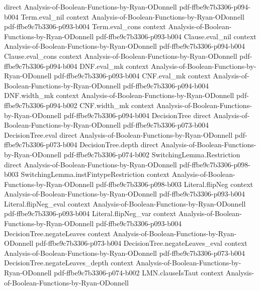 \begin{theorem}
  {direct}
  {Analysis-of-Boolean-Functions-by-Ryan-ODonnell}
  {pdf-ffbe9c7b3306-p094-b004}
\proofstep
  {Term.eval_nil}
  {context}
  {Analysis-of-Boolean-Functions-by-Ryan-ODonnell}
  {pdf-ffbe9c7b3306-p093-b004}
\proofstep
  {Term.eval_cons}
  {context}
  {Analysis-of-Boolean-Functions-by-Ryan-ODonnell}
  {pdf-ffbe9c7b3306-p093-b004}
\proofstep
  {Clause.eval_nil}
  {context}
  {Analysis-of-Boolean-Functions-by-Ryan-ODonnell}
  {pdf-ffbe9c7b3306-p094-b004}
\proofstep
  {Clause.eval_cons}
  {context}
  {Analysis-of-Boolean-Functions-by-Ryan-ODonnell}
  {pdf-ffbe9c7b3306-p094-b004}
\proofstep
  {DNF.eval_mk}
  {context}
  {Analysis-of-Boolean-Functions-by-Ryan-ODonnell}
  {pdf-ffbe9c7b3306-p093-b004}
\proofstep
  {CNF.eval_mk}
  {context}
  {Analysis-of-Boolean-Functions-by-Ryan-ODonnell}
  {pdf-ffbe9c7b3306-p094-b004}
\proofstep
  {DNF.width_mk}
  {context}
  {Analysis-of-Boolean-Functions-by-Ryan-ODonnell}
  {pdf-ffbe9c7b3306-p094-b002}
\proofstep
  {CNF.width_mk}
  {context}
  {Analysis-of-Boolean-Functions-by-Ryan-ODonnell}
  {pdf-ffbe9c7b3306-p094-b004}
\proofstep
  {DecisionTree}
  {direct}
  {Analysis-of-Boolean-Functions-by-Ryan-ODonnell}
  {pdf-ffbe9c7b3306-p073-b004}
\proofstep
  {DecisionTree.eval}
  {direct}
  {Analysis-of-Boolean-Functions-by-Ryan-ODonnell}
  {pdf-ffbe9c7b3306-p073-b004}
\proofstep
  {DecisionTree.depth}
  {direct}
  {Analysis-of-Boolean-Functions-by-Ryan-ODonnell}
  {pdf-ffbe9c7b3306-p074-b002}
\proofstep
  {SwitchingLemma.Restriction}
  {direct}
  {Analysis-of-Boolean-Functions-by-Ryan-ODonnell}
  {pdf-ffbe9c7b3306-p098-b003}
\proofstep
  {SwitchingLemma.instFintypeRestriction}
  {context}
  {Analysis-of-Boolean-Functions-by-Ryan-ODonnell}
  {pdf-ffbe9c7b3306-p098-b003}
\proofstep
  {Literal.flipNeg}
  {context}
  {Analysis-of-Boolean-Functions-by-Ryan-ODonnell}
  {pdf-ffbe9c7b3306-p093-b004}
\proofstep
  {Literal.flipNeg_eval}
  {context}
  {Analysis-of-Boolean-Functions-by-Ryan-ODonnell}
  {pdf-ffbe9c7b3306-p093-b004}
\proofstep
  {Literal.flipNeg_var}
  {context}
  {Analysis-of-Boolean-Functions-by-Ryan-ODonnell}
  {pdf-ffbe9c7b3306-p093-b004}
\proofstep
  {DecisionTree.negateLeaves}
  {context}
  {Analysis-of-Boolean-Functions-by-Ryan-ODonnell}
  {pdf-ffbe9c7b3306-p073-b004}
\proofstep
  {DecisionTree.negateLeaves_eval}
  {context}
  {Analysis-of-Boolean-Functions-by-Ryan-ODonnell}
  {pdf-ffbe9c7b3306-p073-b004}
\proofstep
  {DecisionTree.negateLeaves_depth}
  {context}
  {Analysis-of-Boolean-Functions-by-Ryan-ODonnell}
  {pdf-ffbe9c7b3306-p074-b002}
\proofstep
  {LMN.clauseIsTaut}
  {context}
  {Analysis-of-Boolean-Functions-by-Ryan-ODonnell}

\end{theorem}
